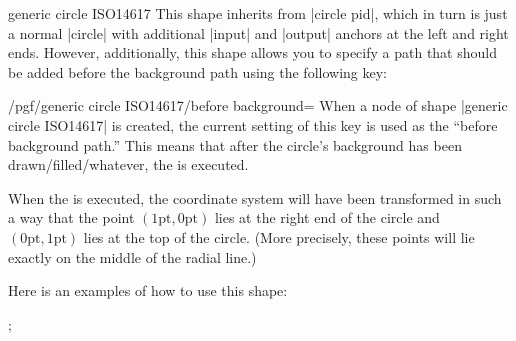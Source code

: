 \documentclass[a4paper]{ltxdoc}
\begin{document}
\begin{shape}{generic circle ISO14617}
 This shape inherits from |circle pid|, which in turn is just a normal
 |circle| with additional |input| and |output| anchors at the left
 and right ends. However, additionally, this shape allows you to
 specify a path that should be added before the background path using
 the following key:
 \begin{key}{/pgf/generic circle ISO14617/before background=}
  When a node of shape |generic circle ISO14617| is created, the current
  setting of this key is used as the ``before background path.''
  This means that after the circle's background has been
  drawn/filled/whatever, the  is executed.

  When the  is executed, the coordinate system will have
  been transformed in such a way that the point
  $(1\mathrm{pt},0\mathrm{pt})$ lies at the right end of the circle
  and $(0\mathrm{pt},1\mathrm{pt})$ lies at the top of the
  circle. (More precisely, these points will lie exactly on the
  middle of the radial line.)
 \end{key}
 Here is an examples of how to use this shape:
 \begin{codeexample}[]
  \tikz \node [generic circle ISO14617,
   circuit symbol size = width 5 height 5,
   /pgf/generic circle ISO14617/before background={
     \pgfpathmoveto{\pgfpoint{-0.5pt}{-0.5pt}}
     \pgfpathlineto{\pgfpoint{1pt}{0pt}}
     \pgfpathlineto{\pgfpoint{0pt}{1pt}}
     \pgfpathlineto{\pgfpoint{-0.5pt}{-0.5pt}}
     \pgfusepath{draw}
    },
   transform shape,
   draw] {};
 \end{codeexample}
\end{shape}
\end{document}

